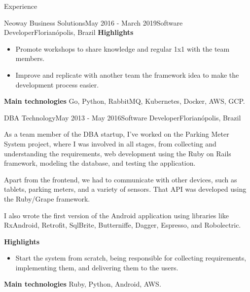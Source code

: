 \documentclass[
	a4paper, %
	10pt, %
]{resume} %
\begin{document}
\begin{rSection}{Experience}
\begin{rSubsection}{Neoway Business Solutions}{May 2016 - March 2019}{Software Developer}{Florianópolis, Brazil}
		\textbf{Highlights}
		\begin{itemize}
			\item Promote workshops to share knowledge and regular 1x1 with the team members.
			\item Improve and replicate with another team the framework idea to make the development process easier.
		\end{itemize}

		\textbf{Main technologies}
			Go, Python, RabbitMQ, Kubernetes, Docker, AWS, GCP.

	\end{rSubsection}


	\begin{rSubsection}{DBA Technology}{May 2013 - May 2016}{Software Developer}{Florianópolis, Brazil}
		\item[]
		As a team member of the DBA startup, I've worked on the Parking Meter System project, where I was involved in all stages,
		from collecting and understanding the requirements, web development using the Ruby on Rails framework, modeling the database, and testing the application.

		Apart from the frontend, we had to communicate with other devices, such as tablets, parking meters, and a variety of sensors.
		That API was developed using the Ruby/Grape framework.

		I also wrote the first version of the Android application using libraries like RxAndroid, Retrofit, SqlBrite, Butterniffe, Dagger, Espresso, and Robolectric.

		\textbf{Highlights}
		\begin{itemize}
			\item Start the system from scratch, being responsible for collecting requirements, implementing them, and delivering them to the users.
		\end{itemize}

		\textbf{Main technologies}
			Ruby, Python, Android, AWS.

	\end{rSubsection}

\end{rSection}


\end{document}
